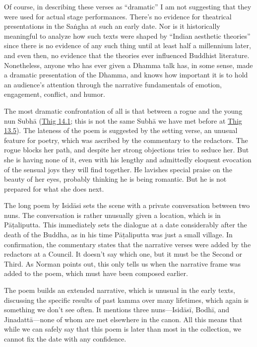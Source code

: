\documentclass[12pt,openany]{book}%
\begin{document}
Of course, in describing these verses as “dramatic” I am not suggesting that they were used for actual stage performances. There’s no evidence for theatrical presentations in the \textsanskrit{Saṅgha} at such an early date. Nor is it historically meaningful to analyze how such texts were shaped by “Indian aesthetic theories” since there is no evidence of any such thing until at least half a millennium later, and even then, no evidence that the theories ever influenced Buddhist literature. Nonetheless, anyone who has ever given a Dhamma talk has, in some sense, made a dramatic presentation of the Dhamma, and knows how important it is to hold an audience’s attention through the narrative fundamentals of emotion, engagement, conflict, and humor.

The most dramatic confrontation of all is that between a rogue and the young nun \textsanskrit{Subhā} (\href{https://suttacentral.net/thig14.1}{Thig 14.1}; this is not the same \textsanskrit{Subhā} we have met before at \href{https://suttacentral.net/thig13.5}{Thig 13.5}). The lateness of the poem is suggested by the setting verse, an unusual feature for poetry, which was ascribed by the commentary to the redactors. The rogue blocks her path, and despite her strong objections tries to seduce her. But she is having none of it, even with his lengthy and admittedly eloquent evocation of the sensual joys they will find together. He lavishes special praise on the beauty of her eyes, probably thinking he is being romantic. But he is not prepared for what she does next.

The long poem by \textsanskrit{Isidāsi} sets the scene with a private conversation between two nuns. The conversation is rather unusually given a location, which is in \textsanskrit{Pāṭaliputta}. This immediately sets the dialogue at a date considerably after the death of the Buddha, as in his time \textsanskrit{Pāṭaliputta} was just a small village. In confirmation, the commentary states that the narrative verses were added by the redactors at a Council. It doesn’t say which one, but it must be the Second or Third. As Norman points out, this only tells us when the narrative frame was added to the poem, which must have been composed earlier.

The poem builds an extended narrative, which is unusual in the early texts, discussing the specific results of past kamma over many lifetimes, which again is something we don’t see often. It mentions three nuns—\textsanskrit{Isidāsī}, \textsanskrit{Bodhī}, and \textsanskrit{Jinadattā}—none of whom are met elsewhere in the canon. All this means that while we can safely say that this poem is later than most in the collection, we cannot fix the date with any confidence.
\end{document}
